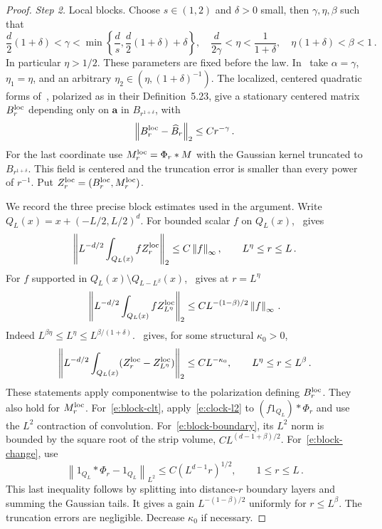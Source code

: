\documentclass[11pt]{amsart}
\theoremstyle{definition}
\theoremstyle{remark}
\numberwithin{equation}{section}
\renewcommand{\a}{\mathbf a}
\newcommand{\norm}[1]{\left\|#1\right\|}
\begin{document}
\begin{proof}
\emph{Step 2.} Local blocks. Choose $s\in(1,2)$ and $\delta>0$ small, then $\gamma,\eta,\beta$ such that
\begin{equation}\label{e:parameters}
 \frac d2(1+\delta)<\gamma<
 \min\left\{\frac ds,\frac d2(1+\delta)+\delta\right\},
 \quad \frac d{2\gamma}<\eta<\frac1{1+\delta},
 \quad \eta(1+\delta)<\beta<1\, .
\end{equation}
In particular $\eta>1/2$. These parameters are fixed before the law. In~\citet[(5.82)]{AKM2019book} take $\alpha=\gamma$, $\eta_1=\eta$, and an arbitrary $\eta_2\in(\eta,(1+\delta)^{-1})$. The localized, centered quadratic forms of~\citet[(5.85)]{AKM2019book}, polarized as in their Definition~5.23, give a stationary centered matrix $B_r^{\rm loc}$ depending only on $\a$ in $B_{r^{1+\delta}}$, with
\begin{equation*}
 \norm{B_r^{\rm loc}-\widehat B_r}_2\leq Cr^{-\gamma}\, .
\end{equation*}
For the last coordinate use $M_r^{\rm loc}=\Phi_r*M$ with the Gaussian kernel truncated to $B_{r^{1+\delta}}$. This field is centered and the truncation error is smaller than every power of $r^{-1}$. Put $Z_r^{\rm loc}=(B_r^{\rm loc},M_r^{\rm loc})$.

We record the three precise block estimates used in the argument. Write $Q_L(x)=x+(-L/2,L/2)^d$. For bounded scalar $f$ on $Q_L(x)$,~\citet[Lemma~5.29(i)]{AKM2019book} gives
\begin{equation}\label{e:block-clt}
 \norm{L^{-d/2}\int_{Q_L(x)}fZ_r^{\rm loc}}_2
 \leq C\norm f_\infty,\qquad L^\eta\leq r\leq L\, .
\end{equation}
For $f$ supported in $Q_L(x)\setminus Q_{L-L^\beta}(x)$,~\citet[Lemma~5.29(ii)]{AKM2019book} gives at $r=L^\eta$
\begin{equation}\label{e:block-boundary}
 \norm{L^{-d/2}\int_{Q_L(x)}fZ_{L^\eta}^{\rm loc}}_2
 \leq CL^{-(1-\beta)/2}\norm f_\infty\, .
\end{equation}
Indeed $L^{\beta\eta}\leq L^\eta\leq L^{\beta/(1+\delta)}$.~\citet[Lemma~5.29(iii)]{AKM2019book} gives, for some structural $\kappa_0>0$,
\begin{equation}\label{e:block-change}
 \norm{L^{-d/2}\int_{Q_L(x)}
       (Z_r^{\rm loc}-Z_{L^\eta}^{\rm loc})}_2
 \leq CL^{-\kappa_0},\qquad L^\eta\leq r\leq L^\beta\, .
\end{equation}
These statements apply componentwise to the polarization defining $B_r^{\rm loc}$. They also hold for $M_r^{\rm loc}$. For~\eqref{e:block-clt}, apply~\eqref{e:clock-l2} to $(f1_{Q_L})*\Phi_r$ and use the $L^2$ contraction of convolution. For~\eqref{e:block-boundary}, its $L^2$ norm is bounded by the square root of the strip volume, $CL^{(d-1+\beta)/2}$. For~\eqref{e:block-change}, use
\begin{equation*}
 \norm{1_{Q_L}*\Phi_r-1_{Q_L}}_{L^2}
 \leq C(L^{d-1}r)^{1/2},\qquad 1\leq r\leq L\, .
\end{equation*}
This last inequality follows by splitting into distance-$r$ boundary layers and summing the Gaussian tails. It gives a gain $L^{-(1-\beta)/2}$ uniformly for $r\leq L^\beta$. The truncation errors are negligible. Decrease $\kappa_0$ if necessary.


\end{proof}
\end{document}
